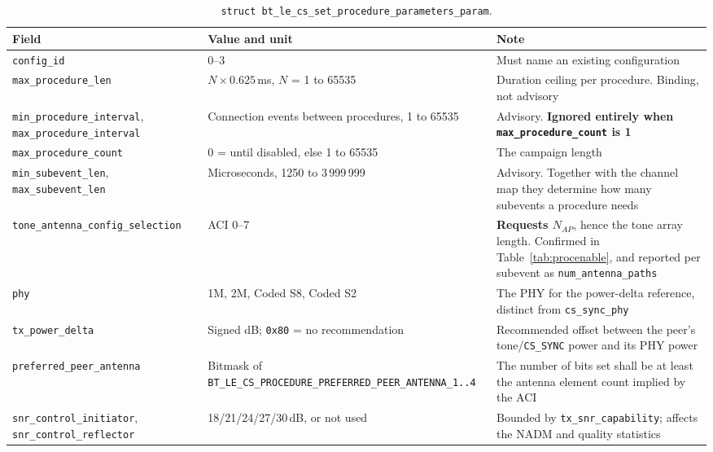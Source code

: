 \documentclass[11pt,a4paper]{article}
\newcommand{\code}[1]{\texttt{\small #1}}
\newcommand{\NADM}{\ensuremath{\mathrm{NADM}}}
\newcommand{\Nap}{\ensuremath{N_{AP}}}
\begin{document}
\begin{table}[htb]
\caption{\code{struct bt\_\allowbreak{}le\_\allowbreak{}cs\_\allowbreak{}set\_\allowbreak{}procedure\_\allowbreak{}parameters\_\allowbreak{}param}.}
\label{tab:procparams}
\centering\scriptsize
\begin{tabular}{@{}L{40mm}L{46mm}L{48mm}@{}}
\toprule
Field & Value and unit & Note \\
\midrule
\code{config\_\allowbreak{}id} & 0--3 & Must name an existing configuration \\
\code{max\_\allowbreak{}procedure\_\allowbreak{}len} & $N\times0.625$\,ms, $N$ = 1 to 65535 & Duration ceiling per procedure. Binding, not advisory \\
\code{min\_\allowbreak{}procedure\_\allowbreak{}interval}, \code{max\_\allowbreak{}procedure\_\allowbreak{}interval} & Connection events between procedures, 1 to 65535 & Advisory. \textbf{Ignored entirely when \code{max\_\allowbreak{}procedure\_\allowbreak{}count} is 1} \\
\code{max\_\allowbreak{}procedure\_\allowbreak{}count} & 0 = until disabled, else 1 to 65535 & The campaign length \\
\code{min\_\allowbreak{}subevent\_\allowbreak{}len}, \code{max\_\allowbreak{}subevent\_\allowbreak{}len} & Microseconds, 1250 to 3\,999\,999 & Advisory. Together with the channel map they determine how many subevents a procedure needs \\
\code{tone\_\allowbreak{}antenna\_\allowbreak{}config\_\allowbreak{}selection} & ACI 0--7 & \textbf{Requests $\Nap$}, hence the tone array length. Confirmed in Table~\ref{tab:procenable}, and reported per subevent as \code{num\_\allowbreak{}antenna\_\allowbreak{}paths} \\
\code{phy} & 1M, 2M, Coded S8, Coded S2 & The PHY for the power-delta reference, distinct from \code{cs\_\allowbreak{}sync\_\allowbreak{}phy} \\
\code{tx\_\allowbreak{}power\_\allowbreak{}delta} & Signed dB; \code{0x80} = no recommendation & Recommended offset between the peer's tone/\code{CS\_\allowbreak{}SYNC} power and its PHY power \\
\code{preferred\_\allowbreak{}peer\_\allowbreak{}antenna} & Bitmask of \code{BT\_\allowbreak{}LE\_\allowbreak{}CS\_\allowbreak{}PROCEDURE\_\allowbreak{}PREFERRED\_\allowbreak{}PEER\_\allowbreak{}ANTENNA\_\allowbreak{}1..4} & The number of bits set shall be at least the antenna element count implied by the ACI \\
\code{snr\_\allowbreak{}control\_\allowbreak{}initiator}, \code{snr\_\allowbreak{}control\_\allowbreak{}reflector} & 18/21/24/27/30\,dB, or not used & Bounded by \code{tx\_\allowbreak{}snr\_\allowbreak{}capability}; affects the $\NADM$ and quality statistics \\
\bottomrule
\end{tabular}
\end{table}
\end{document}

